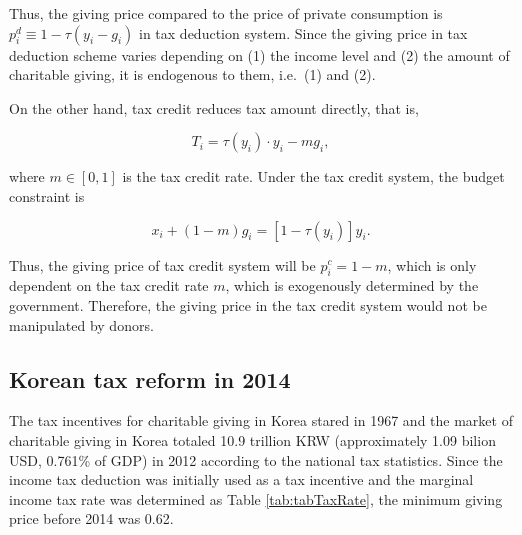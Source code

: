 \documentclass[ review  , 3p ]{elsarticle}
\begin{document}
  Thus, the giving price compared to the price of private consumption is \(p_i^{d} \equiv 1 - \tau(y_i - g_i)\) in tax deduction system. Since the giving price in tax deduction scheme varies depending on (1) the income level and (2) the amount of charitable giving, it is endogenous to them, i.e.~(1) and (2).

  On the other hand, tax credit reduces tax amount directly, that is,

  \[
      T_i = \tau(y_i)\cdot y_i - m g_i,
  \]

  where \(m \in [0, 1]\) is the tax credit rate. Under the tax credit system, the budget constraint is

  \[
      x_i + (1 - m) g_i = [1 - \tau(y_i)] y_i.
  \]

  Thus, the giving price of tax credit system will be \(p_i^c = 1 - m\), which is only dependent on the tax credit rate \(m\), which is exogenously determined by the government.
  Therefore, the giving price in the tax credit system would not be manipulated by donors.

  \hypertarget{korean-tax-reform-in-2014}{%
  \subsection{Korean tax reform in 2014}\label{korean-tax-reform-in-2014}}

  The tax incentives for charitable giving in Korea stared in 1967 and the market of charitable giving in Korea totaled 10.9 trillion KRW (approximately 1.09 bilion USD, 0.761\% of GDP) in 2012 according to the national tax statistics.
  Since the income tax deduction was initially used as a tax incentive and the marginal income tax rate was determined as Table \ref{tab:tabTaxRate}, the minimum giving price before 2014 was 0.62.
\end{document}
